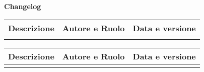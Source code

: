 \newpage

\begin{center}
	\Large{\textbf{Changelog}}
	\\\vspace{0.5cm}
	\normalsize
	\begin{tabularx}{\textwidth}{Xcc}
		\textbf{Descrizione} & \textbf{Autore e Ruolo} & \textbf{Data e versione} \\\toprule
		\modificheuno
		\bottomrule
	\end{tabularx}
	\newpage
	\begin{tabularx}{\textwidth}{Xcc}
		\textbf{Descrizione} & \textbf{Autore e Ruolo} & \textbf{Data e versione} \\\toprule
		\modifichedue
		\bottomrule
	\end{tabularx}
\end{center}
\newpage